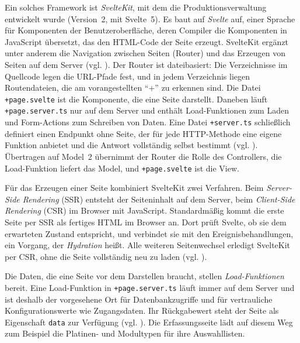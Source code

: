 Ein solches Framework ist \emph{SvelteKit}, mit dem die Produktionsverwaltung
entwickelt wurde (Version~2, mit Svelte~5). Es baut auf \emph{Svelte} auf, einer
Sprache für Komponenten der Benutzeroberfläche, deren Compiler die Komponenten
in JavaScript übersetzt, das den HTML-Code der Seite erzeugt. SvelteKit ergänzt
unter anderem die Navigation zwischen Seiten (Router) und das Erzeugen von
Seiten auf dem Server (vgl. \cite[Abschnitt
\enquote{Introduction}]{IntroductionSvelteKitDocsa}). Der Router ist
dateibasiert: Die Verzeichnisse im Quellcode legen die URL-Pfade fest, und in
jedem Verzeichnis liegen Routendateien, die am vorangestellten \enquote{+} zu
erkennen sind. Die Datei \texttt{+page.svelte} ist die Komponente, die eine
Seite darstellt. Daneben läuft \texttt{+page.server.ts} nur auf dem Server und
enthält Load-Funktionen zum Laden und Form-Actions zum Schreiben von Daten.
Eine Datei \texttt{+server.ts} schließlich definiert einen Endpunkt ohne Seite,
der für jede HTTP-Methode eine eigene Funktion anbietet und die Antwort
vollständig selbst bestimmt (vgl. \cite[Abschnitt
\enquote{Routing}]{IntroductionSvelteKitDocsa}). Übertragen auf Model~2
übernimmt der Router die Rolle des Controllers, die Load-Funktion liefert das
Model, und \texttt{+page.svelte} ist die View.

Für das Erzeugen einer Seite kombiniert SvelteKit zwei Verfahren. Beim
\emph{Server-Side Rendering} (SSR) entsteht der Seiteninhalt auf dem Server,
beim \emph{Client-Side Rendering} (CSR) im Browser mit JavaScript.
Standardmäßig kommt die erste Seite per SSR als fertiges HTML im Browser an.
Dort prüft Svelte, ob sie dem erwarteten Zustand entspricht, und verbindet sie
mit den Ereignisbehandlungen, ein Vorgang, der \emph{Hydration} heißt. Alle
weiteren Seitenwechsel erledigt SvelteKit per CSR, ohne die Seite vollständig
neu zu laden (vgl. \cite[Abschnitt \enquote{Glossary}]{IntroductionSvelteKitDocsa}).

Die Daten, die eine Seite vor dem Darstellen braucht, stellen
\emph{Load-Funktionen} bereit. Eine Load-Funktion in \texttt{+page.server.ts}
läuft immer auf dem Server und ist deshalb der vorgesehene Ort für
Datenbankzugriffe und für vertrauliche Konfigurationswerte wie Zugangsdaten.
Ihr Rückgabewert steht der Seite als Eigenschaft \texttt{data} zur Verfügung
(vgl. \cite[Abschnitt \enquote{Loading data}]{IntroductionSvelteKitDocsa}). Die
Erfassungsseite lädt auf diesem Weg zum Beispiel die Platinen- und Modultypen
für ihre Auswahllisten.

